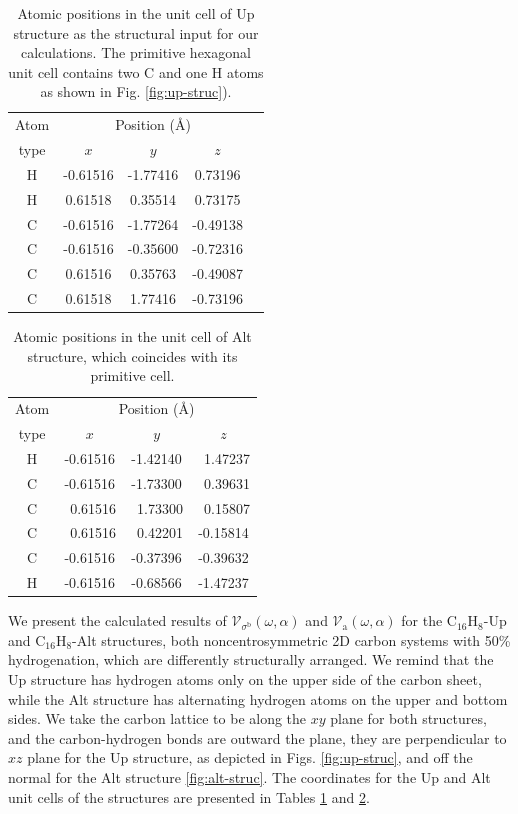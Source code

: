 \documentclass[floatfix,prb,aps,superscriptaddress,showpacs,11pt,preprint,letterpaper]{revtex4}
\begin{document}
\begin{table}[t]
\center
\begin{tabular}{ccccc}\\
\hline
\quad Atom \qquad & \multicolumn{3}{c}{Position (\AA)} \\
\cline{2-4}
\quad type \qquad & $x$ & $y$ & $z$  \\
\hline
H & -0.61516 & -1.77416 &  0.73196 \\
H &  0.61518 &  0.35514 &  0.73175 \\
C & -0.61516 & -1.77264 & -0.49138 \\
C & -0.61516 & -0.35600 & -0.72316 \\
C &  0.61516 &  0.35763 & -0.49087 \\
C &  0.61518 &  1.77416 & -0.73196 \\
\hline
\end{tabular}
\caption{Atomic positions in the unit cell of Up structure as the structural
input for our calculations. {\color{blue}The primitive hexagonal unit cell
contains two C and one H atoms as shown in Fig. \ref{fig:up-struc})}. }
\label{tab:up-unitcell}
\end{table}
\begin{table}[t]
\center
\begin{tabular}{cccc}\\
\hline
\quad Atom \qquad & \multicolumn{3}{c}{Position (\AA)} \\
\cline{2-4}
\quad type \qquad & $x$ & $y$ & $z$  \\
\hline
H &  -0.61516 &  -1.42140 & \ 1.47237 \\
C &  -0.61516 &  -1.73300 & \ 0.39631 \\
C & \ 0.61516 & \ 1.73300 & \ 0.15807 \\
C & \ 0.61516 & \ 0.42201 &  -0.15814 \\
C &  -0.61516 &  -0.37396 &  -0.39632 \\
H &  -0.61516 &  -0.68566 &  -1.47237 \\
\hline
\end{tabular}
\caption{Atomic positions in the unit cell of Alt structure, which coincides
with its primitive cell. }
\label{tab:alt-unitcell}
\end{table}

We present the calculated results of
$\mathcal{V}_{\sigma^{\mathrm{b}}}(\omega,\alpha)$ and
$\mathcal{V}_{\mathrm{a}}(\omega,\alpha)$ for the C$_{16}$H$_{8}$-Up  and
C$_{16}$H$_{8}$-Alt structures, both noncentrosymmetric 2D carbon systems with
50\% hydrogenation, which are differently structurally arranged. We remind that
the Up structure has hydrogen atoms only on the upper side of the carbon sheet,
while the Alt structure has alternating hydrogen atoms on the upper and bottom
sides. We take the carbon lattice to be along the $xy$ plane for both
structures, and the carbon-hydrogen bonds are outward the plane, they are
perpendicular to  $xz$ plane for the Up structure, as depicted in Figs.
\ref{fig:up-struc}, and off the normal for the Alt structure 
\ref{fig:alt-struc}. The coordinates for the Up and Alt unit cells of the
structures are presented in Tables \ref{tab:up-unitcell} and 
\ref{tab:alt-unitcell}.
\end{document}
